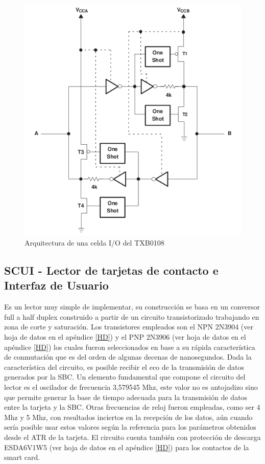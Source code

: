 \bigskip
\bigskip
\begin{figure}[H]
\centering
  \begin{center}
  \includegraphics[scale=.4]{Imagenes/TXB0108.png} 
  \end{center}
  \caption{Arquitectura de una celda I/O del TXB0108}\label{Fig:Celda_TXB0108} 
\end{figure}

\newpage
\subsection{SCUI - Lector de tarjetas de contacto e Interfaz de Usuario}


Es un lector muy simple de implementar, su construcción se basa en un conversor full a half duplex construido a partir de un circuito transistorizado trabajando en zona de corte y saturación. Los transistores empleados son el NPN 2N3904 (ver hoja de datos en el apéndice \ref{HD}) y el PNP 2N3906 (ver hoja de datos en el apéndice \ref{HD}) los cuales fueron seleccionados en base a su rápida característica de conmutación que es del orden de algunas decenas de nanosegundos. Dada la característica del circuito, es posible recibir el eco de la transmisión de datos generados por la SBC. 
Un elemento fundamental que compone el circuito del lector es el oscilador de frecuencia 3,579545 Mhz, este valor no es antojadizo sino que permite generar la base de tiempo adecuada para la transmisión de datos entre la tarjeta y la SBC. Otras frecuencias de reloj fueron empleadas, como ser 4 Mhz y 5 Mhz, con resultados inciertos en la recepción de los datos, aún cuando sería posible usar estos valores según la referencia \cite{SCHb} para los parámetros obtenidos desde el ATR de la tarjeta. 
El circuito cuenta también con protección de descarga ESDA6V1W5 (ver hoja de datos en el apéndice \ref{HD}) para los contactos de la smart card.

